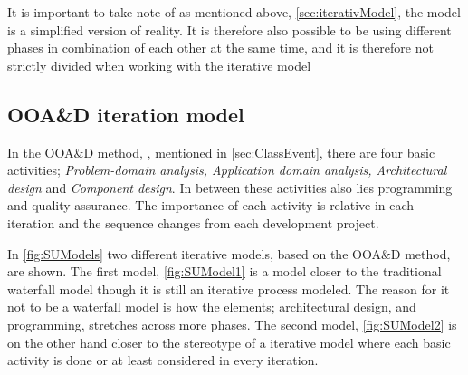 It is important to take note of as mentioned above, \cref{sec:iterativModel}, the model is a simplified version of reality.
It is therefore also possible to be using different phases in combination of each other at the same time, and it is therefore not strictly divided when working with the iterative model

\subsection{OOA\&D iteration model}\label{sec:Iterative3}

In the OOA\&D method, \cite{Rod-Aalborg}, mentioned in \cref{sec:ClassEvent},  there are four basic activities; \textit{Problem-domain analysis, Application domain analysis, Architectural design} and \textit{Component design}.
In between these activities  also lies programming and quality assurance.
The importance of each activity is relative in each iteration and the sequence changes from each development project.


In \cref{fig:SUModels} two different iterative models, based on the OOA\&D method, are shown.
The first model, \cref{fig:SUModel1} is a model closer to the traditional waterfall model though it is still an iterative process modeled.
The reason for it not to be a waterfall model is how the elements; architectural design, and programming, stretches across more phases.
The second model, \cref{fig:SUModel2} is on the other hand closer to the stereotype of a iterative model where each basic activity is done or at least considered in every iteration.

